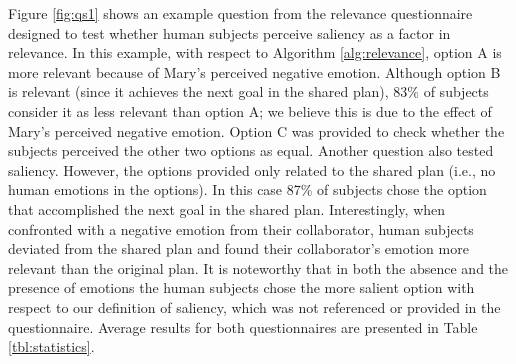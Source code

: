 \documentclass{article}
\begin{document}
Figure \ref{fig:qs1} shows an example question from the relevance questionnaire
designed to test whether human subjects perceive saliency as a factor in
relevance. In this example, with respect to Algorithm \ref{alg:relevance},
option A is more relevant because of Mary's perceived negative emotion. Although
option B is relevant (since it achieves the next goal in the shared plan), 83\% of
subjects consider it as less relevant than option A; we believe this is due to
the effect of Mary's perceived negative emotion. Option C was provided to
check whether the subjects perceived the other two options as equal. Another
question also tested saliency. However, the options provided only related to the
shared plan (i.e., no human emotions in the options). In this case 87\% of
subjects chose the option that accomplished the next goal in the shared plan.
Interestingly, when confronted with a negative emotion from their collaborator,
human subjects deviated from the shared plan and found their collaborator's
emotion more relevant than the original plan. It is noteworthy that in both the
absence and the presence of emotions the human subjects chose the more salient
option with respect to our definition of saliency, which was not referenced or
provided in the questionnaire. Average results for both questionnaires are
presented in Table \ref{tbl:statistics}.

% 
\end{document}
